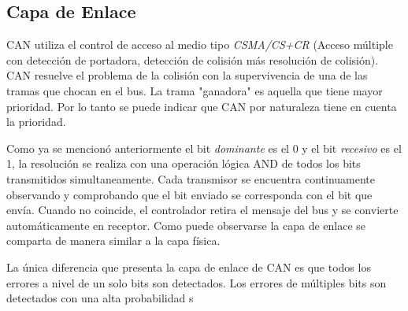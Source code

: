 \subsection{Capa de Enlace}
CAN utiliza el control de acceso al medio tipo \textit{CSMA/CS+CR} (Acceso múltiple con detección de portadora, detección de colisión más resolución de colisión). CAN resuelve el problema de la colisión con la supervivencia de una de las tramas que chocan en el bus. La trama "ganadora" es aquella que tiene mayor prioridad. Por lo tanto se puede indicar que CAN por naturaleza tiene en cuenta la prioridad.

Como ya se mencionó anteriormente el bit \textit{dominante} es el 0 y el bit \textit{recesivo} es el 1, la resolución se realiza con una operación lógica AND de todos los bits transmitidos simultaneamente. Cada transmisor se encuentra continuamente
observando y comprobando que el bit enviado se corresponda con el bit que envía. Cuando no coincide, el controlador retira el mensaje del bus y se convierte automáticamente en receptor. Como puede observarse la capa de enlace se comparta de manera similar a la capa física.

La única diferencia que presenta la capa de enlace de CAN es que todos los errores a nivel de un solo bits son detectados. Los errores de múltiples bits son detectados con una alta probabilidad \citep{can-ciaWEB}
s
